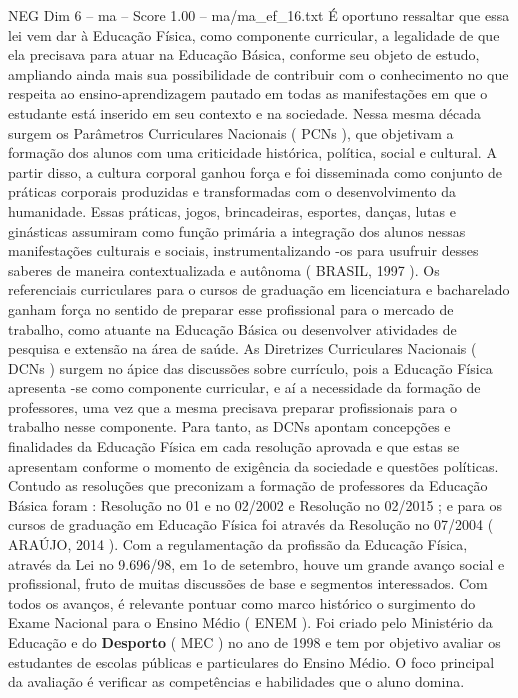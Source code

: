 \begin{textsample}{NEG Dim 6 – ma – Score 1.00 – ma/ma\_ef\_16.txt}
É oportuno ressaltar que essa lei vem dar à Educação Física, como componente curricular, a legalidade de que ela precisava para atuar na Educação Básica, conforme seu objeto de estudo, ampliando ainda mais sua possibilidade de contribuir com o conhecimento no que respeita ao ensino-aprendizagem pautado em todas as manifestações em que o estudante está inserido em seu contexto e na sociedade.
Nessa mesma década surgem os Parâmetros Curriculares Nacionais ( PCNs ), que objetivam a formação dos alunos com uma criticidade histórica, política, social e cultural.
A partir disso, a cultura corporal ganhou força e foi disseminada como conjunto de práticas corporais produzidas e transformadas com o desenvolvimento da humanidade.
Essas práticas, jogos, brincadeiras, esportes, danças, lutas e ginásticas assumiram como função primária a integração dos alunos nessas manifestações culturais e sociais, instrumentalizando -os para usufruir desses saberes de maneira contextualizada e autônoma ( BRASIL, 1997 ).
Os referenciais curriculares para o cursos de graduação em licenciatura e bacharelado ganham força no sentido de preparar esse profissional para o mercado de trabalho, como atuante na Educação Básica ou desenvolver atividades de pesquisa e extensão na área de saúde.
As Diretrizes Curriculares Nacionais ( DCNs ) surgem no ápice das discussões sobre currículo, pois a Educação Física apresenta -se como componente curricular, e aí a necessidade da formação de professores, uma vez que a mesma precisava preparar profissionais para o trabalho nesse componente.
Para tanto, as DCNs apontam concepções e finalidades da Educação Física em cada resolução aprovada e que estas se apresentam conforme o momento de exigência da sociedade e questões políticas.
Contudo as resoluções que preconizam a formação de professores da Educação Básica foram : Resolução no 01 e no 02/2002 e Resolução no 02/2015 ; e para os cursos de graduação em Educação Física foi através da Resolução no 07/2004 ( ARAÚJO, 2014 ).
Com a regulamentação da profissão da Educação Física, através da Lei no 9.696/98, em 1o de setembro, houve um grande avanço social e profissional, fruto de muitas discussões de base e segmentos interessados.
Com todos os avanços, é relevante pontuar como marco histórico o surgimento do Exame Nacional para o Ensino Médio ( ENEM ).
Foi criado pelo Ministério da Educação e do \textbf{Desporto} ( MEC ) no ano de 1998 e tem por objetivo avaliar os estudantes de escolas públicas e particulares do Ensino Médio.
O foco principal da avaliação é verificar as competências e habilidades que o aluno domina.

\end{textsample}
